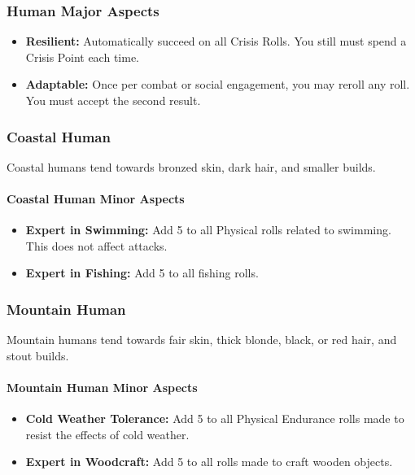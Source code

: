 \begin{multicols}{2}
\subsubsection{Human Major Aspects}

\begin{itemize}
    \item \textbf{Resilient:} Automatically succeed on all Crisis Rolls. You still must spend a Crisis Point each time.
    \item \textbf{Adaptable:} Once per combat or social engagement, you may reroll any roll. You must accept the second result.
\end{itemize}

\subsubsection{Coastal Human}

Coastal humans tend towards bronzed skin, dark hair, and smaller builds.

\paragraph{Coastal Human Minor Aspects}

\begin{itemize}
    \item \textbf{Expert in Swimming:} Add 5 to all Physical rolls related to swimming. This does not affect attacks.
    \item \textbf{Expert in Fishing:} Add 5 to all fishing rolls.
\end{itemize}

\subsubsection{Mountain Human}

Mountain humans tend towards fair skin, thick blonde, black, or red hair, and stout builds.

\paragraph{Mountain Human Minor Aspects}

\begin{itemize}
    \item \textbf{Cold Weather Tolerance:} Add 5 to all Physical Endurance rolls made to resist the effects of cold weather.
    \item \textbf{Expert in Woodcraft:} Add 5 to all rolls made to craft wooden objects.
\end{itemize}


\end{multicols}
